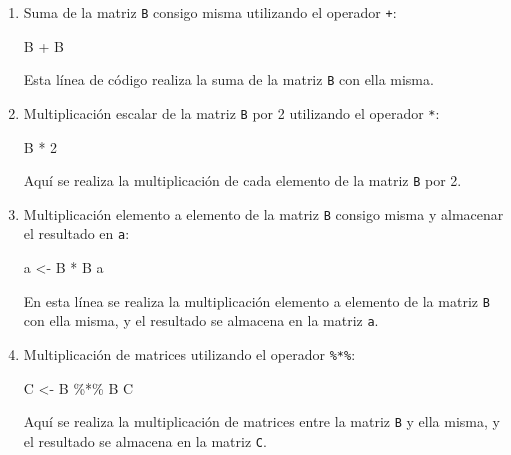 \documentclass[
  letterpaper,
  DIV=11,
  numbers=noendperiod]{scrartcl}
\newenvironment{Shaded}{}{}
\newcommand{\DecValTok}[1]{\textcolor[rgb]{0.00,0.36,0.77}{#1}}
\newcommand{\NormalTok}[1]{\textcolor[rgb]{0.14,0.16,0.18}{#1}}
\newcommand{\OtherTok}[1]{\textcolor[rgb]{0.44,0.26,0.76}{#1}}
\newcommand{\SpecialCharTok}[1]{\textcolor[rgb]{0.00,0.36,0.77}{#1}}
\begin{document}
\begin{enumerate}
\def\labelenumi{\arabic{enumi}.}
\item
  Suma de la matriz \texttt{B} consigo misma utilizando el operador
  \texttt{+}:

\begin{Shaded}
\begin{Highlighting}[]
\NormalTok{B }\SpecialCharTok{+}\NormalTok{ B}
\end{Highlighting}
\end{Shaded}

  Esta línea de código realiza la suma de la matriz \texttt{B} con ella
  misma.
\item
  Multiplicación escalar de la matriz \texttt{B} por 2 utilizando el
  operador \texttt{*}:

\begin{Shaded}
\begin{Highlighting}[]
\NormalTok{B }\SpecialCharTok{*} \DecValTok{2}
\end{Highlighting}
\end{Shaded}

  Aquí se realiza la multiplicación de cada elemento de la matriz
  \texttt{B} por 2.
\item
  Multiplicación elemento a elemento de la matriz \texttt{B} consigo
  misma y almacenar el resultado en \texttt{a}:

\begin{Shaded}
\begin{Highlighting}[]
\NormalTok{a }\OtherTok{\textless{}{-}}\NormalTok{ B }\SpecialCharTok{*}\NormalTok{ B}
\NormalTok{a}
\end{Highlighting}
\end{Shaded}

  En esta línea se realiza la multiplicación elemento a elemento de la
  matriz \texttt{B} con ella misma, y el resultado se almacena en la
  matriz \texttt{a}.
\item
  Multiplicación de matrices utilizando el operador \texttt{\%*\%}:

\begin{Shaded}
\begin{Highlighting}[]
\NormalTok{C }\OtherTok{\textless{}{-}}\NormalTok{ B }\SpecialCharTok{\%*\%}\NormalTok{ B}
\NormalTok{C}
\end{Highlighting}
\end{Shaded}

  Aquí se realiza la multiplicación de matrices entre la matriz
  \texttt{B} y ella misma, y el resultado se almacena en la matriz
  \texttt{C}.
\end{enumerate}
\end{document}
